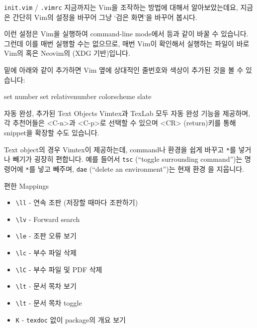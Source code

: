 \documentclass{beamer}
\begin{document}
\begin{frame}[fragile]{\texttt{init.vim} / \texttt{.vimrc}}
  지금까지는 Vim을 조작하는 방법에 대해서 알아보았는데요, 지금은 간단히 Vim의
  설정을 바꾸어 그냥 `검은 화면'을 바꾸어 봅시다.

  \pause
  이런 설정은 Vim을 실행하여 command-line mode에서  등과 같이
  바꿀 수 있습니다.
  그런데 이를 매번 실행할 수는 없으므로, 매번 Vim이 확인해서 실행하는 파일이
  바로 Vim의  혹은 Neovim의  (XDG 기반)입니다.

  \pause
   밑에 아래와 같이 추가하면 Vim 옆에 상대적인 줄번호와
  색상이 추가된 것을 볼 수 있습니다:
  \begin{vimcode}
    set number
    set relativenumber
    colorscheme slate
  \end{vimcode}
\end{frame}

\begin{frame}[fragile]{자동 완성, 추가된 Text Objects}
  Vimtex과 TexLab 모두 자동 완성 기능을 제공하며, 각 추천어들은 <C-n>과 <C-p>로
  선택할 수 있으며 <CR> (return)키를 통해 snippet을 확장할 수도 있습니다.

  \pause
  Text object의 경우 Vimtex이 제공하는데, command나 환경을 쉽게 바꾸고
  \verb|*|를 넣거나 빼기가 굉장히 편합니다.
  예를 들어서 \verb/tsc/ (``toggle surrounding command'')는 명령어에 \verb|*|를
  넣고 빼주며, \verb/dae/ (``delete an environment'')는 현재 환경
  을 지웁니다.
\end{frame}

\begin{frame}[fragile]{편한 Mappings}
  \begin{itemize}
    \item \verb/\ll/ - 연속 조판 (저장할 때마다 조판하기)
    \item \verb/\lv/ - Forward search
    \item \verb/\le/ - 조판 오류 보기
    \item \verb/\lc/ - 부수 파일 삭제
    \item \verb/\lC/ - 부수 파일 및 PDF 삭제
    \item \verb/\lt/ - 문서 목차 보기
    \item \verb/\lt/ - 문서 목차 toggle
    \item \verb/K/ - \verb/texdoc/ 없이 package의 개요 보기
  \end{itemize}
\end{frame}
\end{document}
